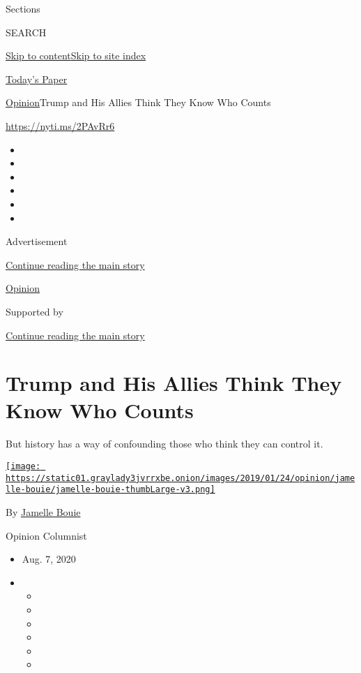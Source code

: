 Sections

SEARCH

\protect\hyperlink{site-content}{Skip to
content}\protect\hyperlink{site-index}{Skip to site index}

\href{https://myaccount.nytimes3xbfgragh.onion/auth/login?response_type=cookie\&client_id=vi}{}

\href{https://www.nytimes3xbfgragh.onion/section/todayspaper}{Today's
Paper}

\href{/section/opinion}{Opinion}\textbar{}Trump and His Allies Think
They Know Who Counts

\href{https://nyti.ms/2PAvRr6}{https://nyti.ms/2PAvRr6}

\begin{itemize}
\item
\item
\item
\item
\item
\item
\end{itemize}

Advertisement

\protect\hyperlink{after-top}{Continue reading the main story}

\href{/section/opinion}{Opinion}

Supported by

\protect\hyperlink{after-sponsor}{Continue reading the main story}

\hypertarget{trump-and-his-allies-think-they-know-who-counts}{%
\section{Trump and His Allies Think They Know Who
Counts}\label{trump-and-his-allies-think-they-know-who-counts}}

But history has a way of confounding those who think they can control
it.

\href{https://www.nytimes3xbfgragh.onion/column/jamelle-bouie}{\texttt{[image: https://static01.graylady3jvrrxbe.onion/images/2019/01/24/opinion/jamelle-bouie/jamelle-bouie-thumbLarge-v3.png]}}

By
\href{https://www.nytimes3xbfgragh.onion/column/jamelle-bouie}{Jamelle
Bouie}

Opinion Columnist

\begin{itemize}
\item
  Aug. 7, 2020
\item
  \begin{itemize}
  \item
  \item
  \item
  \item
  \item
  \item
  \end{itemize}
\end{itemize}


